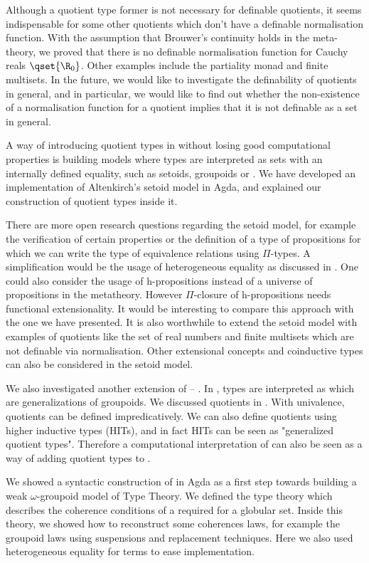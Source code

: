 Although a quotient type former is not necessary for definable
quotients, it seems indispensable for some other quotients which don't
have a definable normalisation function. With the assumption that
Brouwer's continuity holds in the meta-theory, we proved that there is
no definable normalisation function for Cauchy reals
$\qset{\R_{0}}$. Other examples include the partiality monad and
finite multisets.  In the future, we would like to investigate the
definability of quotients in general, and in particular, we would like
to find out whether the non-existence of a normalisation function for
a quotient implies that it is not definable as a set in general.


A way of introducing quotient types in \itt without losing good
computational properties is building models where types are
interpreted as sets with an internally defined equality, such as
setoids, groupoids or \wog. We have developed an implementation of
Altenkirch's setoid model in Agda, and explained our construction of
quotient types inside it.


There are more open research questions regarding the setoid model, for
example the verification of certain properties or the definition of a
type of propositions for which we can write the type of equivalence
relations using $\Pi$-types. A simplification would be the usage of
heterogeneous equality as discussed in . One could also
consider the usage of h-propositions instead of a universe of
propositions in the metatheory. However $\Pi$-closure of
h-propositions needs functional extensionality. It would be
interesting to compare this approach with the one we have
presented. It is also worthwhile to extend the setoid model with
examples of quotients like the set of real numbers and finite
multisets which are not definable via normalisation.  Other
extensional concepts and coinductive types can also be considered in
the setoid model.


We also investigated another extension of \mltt -- \hott. In \hott,
types are interpreted as \wog which are generalizations of
groupoids. We discussed quotients in \hott. With univalence, quotients
can be defined impredicatively. We can also define quotients using
higher inductive types (HITs), and in fact HITs can be seen as
"generalized quotient types".  Therefore a computational
interpretation of \hott can also be seen as a way of adding quotient
types to \itt.

We showed a syntactic construction of \wog in Agda as a first step
towards building a weak $\omega$-groupoid model of Type Theory. We
defined the type theory \tig which describes the coherence conditions
of a \wogs required for a globular set. Inside this theory, we showed
how to reconstruct some coherences laws, for example the groupoid laws
using suspensions and replacement techniques. Here we also used
heterogeneous equality for terms to ease implementation.

